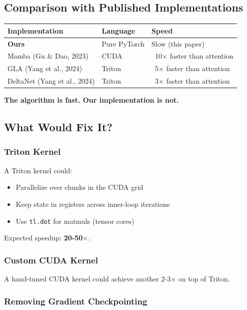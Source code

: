 \subsection{Comparison with Published Implementations}

\begin{table}[H]
\centering
\small
\begin{tabular}{lll}
\toprule
\textbf{Implementation} & \textbf{Language} & \textbf{Speed} \\
\midrule
\textbf{Ours} & Pure PyTorch & Slow (this paper) \\
Mamba (Gu \& Dao, 2023) & CUDA & ~10$\times$ faster than attention \\
GLA (Yang et al., 2024) & Triton & ~5$\times$ faster than attention \\
DeltaNet (Yang et al., 2024) & Triton & ~3$\times$ faster than attention \\
\bottomrule
\end{tabular}
\end{table}

\textbf{The algorithm is fast. Our implementation is not.}

\subsection{What Would Fix It?}

\subsubsection{Triton Kernel}

A Triton kernel could:
\begin{itemize}
\item Parallelize over chunks in the CUDA grid
\item Keep state in registers across inner-loop iterations
\item Use \texttt{tl.dot} for matmuls (tensor cores)

\end{itemize}
Expected speedup: \textbf{20-50$\times$}.

\subsubsection{Custom CUDA Kernel}

A hand-tuned CUDA kernel could achieve another 2-3$\times$ on top of Triton.

\subsubsection{Removing Gradient Checkpointing}

